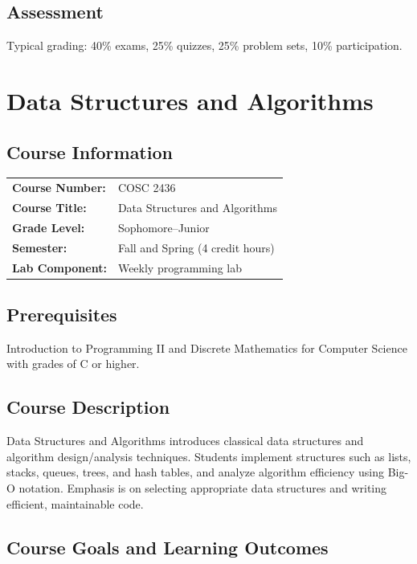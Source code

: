 \documentclass[12pt,oneside]{book}
\begin{document}
\section{Assessment}

Typical grading: 40\% exams, 25\% quizzes, 25\% problem sets, 10\% participation.


\chapter{Data Structures and Algorithms}

\section{Course Information}

\begin{tabular}{ll}
\textbf{Course Number:} & COSC 2436 \\
\textbf{Course Title:} & Data Structures and Algorithms \\
\textbf{Grade Level:} & Sophomore--Junior \\
\textbf{Semester:} & Fall and Spring (4 credit hours) \\
\textbf{Lab Component:} & Weekly programming lab \\
\end{tabular}

\section{Prerequisites}

Introduction to Programming II and Discrete Mathematics for Computer Science with grades of C or higher.

\section{Course Description}

Data Structures and Algorithms introduces classical data structures and algorithm design/analysis techniques. Students implement structures such as lists, stacks, queues, trees, and hash tables, and analyze algorithm efficiency using Big-O notation. Emphasis is on selecting appropriate data structures and writing efficient, maintainable code.

\section{Course Goals and Learning Outcomes}
\end{document}
